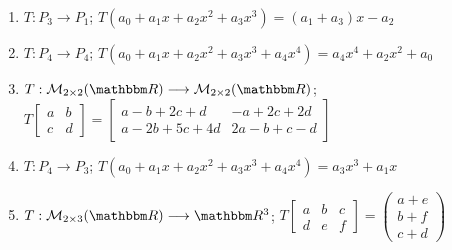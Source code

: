 \begin{enumerate}[resume]
    \item $T: P_{3} \longrightarrow P_{1}$; $T\left(a_{0}+a_{1} x+a_{2} x^{2}+a_{3} x^{3}\right)=\left(a_{1}+a_{3}\right) x-a_{2}$
    \item $T: P_{4} \longrightarrow P_{4}$; $T\left(a_{0}+a_{1} x+a_{2} x^{2}+a_{3} x^{3}+a_{4} x^{4}\right)=a_{4} x^{4}+a_{2} x^{2}+a_{0}$
    \item $T: \mathcal{M}_{2 \times 2}(\RR) \longrightarrow \mathcal{M}_{2 \times 2}(\RR)$; $T\begin{bmatrix*}a & b \\ c & d\end{bmatrix*}=\begin{bmatrix*}a-b+2 c+d & -a+2 c+2 d \\ a-2 b+5 c+4 d & 2 a-b+c-d\end{bmatrix*}$
    \item $T: P_{4} \longrightarrow P_{3}$; $T\left(a_{0}+a_{1} x+a_{2} x^{2}+a_{3} x^{3}+a_{4} x^{4}\right)=a_{3} x^{3}+a_{1} x$
    \item $T: \mathcal{M}_{2 \times 3}(\RR) \longrightarrow \RR[3]$; $T\begin{bmatrix*}a & b & c \\ d & e & f\end{bmatrix*}=\begin{pmatrix*}a+e \\ b+f \\ c+d\end{pmatrix*}$
\end{enumerate}